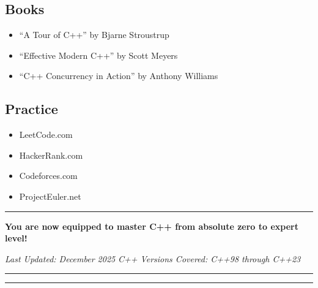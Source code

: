 \hypertarget{books}{%
\subsection{Books}\label{books}}

\begin{itemize}
\tightlist
\item
  ``A Tour of C++'' by Bjarne Stroustrup
\item
  ``Effective Modern C++'' by Scott Meyers
\item
  ``C++ Concurrency in Action'' by Anthony Williams
\end{itemize}

\hypertarget{practice}{%
\subsection{Practice}\label{practice}}

\begin{itemize}
\tightlist
\item
  LeetCode.com
\item
  HackerRank.com
\item
  Codeforces.com
\item
  ProjectEuler.net
\end{itemize}

\begin{center}\rule{0.5\linewidth}{0.5pt}\end{center}

\textbf{You are now equipped to master C++ from absolute zero to expert
level!}

\emph{Last Updated: December 2025} \emph{C++ Versions Covered: C++98
through C++23}

\begin{center}\rule{0.5\linewidth}{0.5pt}\end{center}

\begin{center}\rule{0.5\linewidth}{0.5pt}\end{center}
